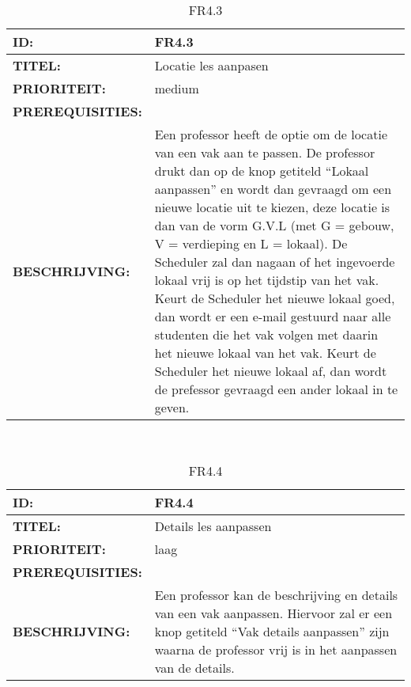 \noindent\begin{table}[h]
            \begin{tabular}{l | p{10cm}}
                \textbf{ID:} & FR4.3 \\ \hline
                \textbf{TITEL:} & Locatie les aanpasen\\ \hline
                \textbf{PRIORITEIT:} &  medium \\ \hline
                \textbf{PREREQUISITIES:} & \\ \hline
                \textbf{BESCHRIJVING:} & Een professor heeft de optie om de locatie van een vak aan te passen. 
                                        De professor drukt dan op de knop getiteld “Lokaal aanpassen” en wordt dan gevraagd om een nieuwe locatie uit te kiezen, deze locatie is dan van de vorm G.V.L (met G = gebouw, V = verdieping en L = lokaal). De Scheduler zal dan nagaan of het ingevoerde lokaal vrij is op het tijdstip van het vak. Keurt de Scheduler het nieuwe lokaal goed, dan wordt er een e-mail gestuurd naar alle studenten die het vak volgen met daarin het nieuwe lokaal van het vak. Keurt de Scheduler het nieuwe lokaal af, dan wordt de prefessor gevraagd een ander lokaal in te geven.\\ 
            \end{tabular}\\
            \caption{FR4.3}
            \label{tab:myeighteenthtable}
        \end{table}
        
\noindent\begin{table}[h]
            \begin{tabular}{l | p{10cm}}
                \textbf{ID:} & FR4.4 \\ \hline
                \textbf{TITEL:} & Details les aanpassen\\ \hline
                \textbf{PRIORITEIT:} &  laag \\ \hline
                \textbf{PREREQUISITIES:} & \\ \hline
                \textbf{BESCHRIJVING:} & Een professor kan de beschrijving en details van een vak aanpassen.                                              Hiervoor zal er een knop getiteld “Vak details aanpassen” zijn waarna de professor vrij is in het aanpassen van de details. \\ 
            \end{tabular}\\
            \caption{FR4.4}
            \label{tab:myfourteenthtable}
        \end{table}
        
